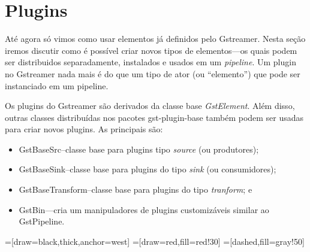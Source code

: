 \section{Plugins}
\label{sec:plugins}
Até agora só vimos como usar elementos já definidos pelo Gstreamer.  Nesta
seção iremos discutir como é possível criar novos tipos de elementos---os quais
podem ser distribuidos separadamente, instalados e usados em um
\emph{pipeline}.  Um plugin no Gstreamer nada mais é do que um tipo de ator (ou
``elemento'') que pode ser instanciado em um pipeline.



Os plugins do Gstreamer são derivados da classe base \emph{GstElement}.  Além
disso, outras classes distribuídas nos pacotes gst-plugin-base também podem ser
usadas para criar novos plugins.  As principais são:

\begin{itemize}
  \item{GstBaseSrc}--classe base para plugins tipo \emph{source} (ou
                     produtores);
  \item{GstBaseSink}--classe base para plugins do tipo \emph{sink} (ou
                      consumidores);
  \item{GstBaseTransform}--classe base para plugins do tipo \emph{tranform}; e
  \item{GstBin}---cria um manipuladores de plugins customizáveis similar ao
                  GstPipeline.
\end{itemize}

=[draw=black,thick,anchor=west]
=[draw=red,fill=red!30]
=[dashed,fill=gray!50]
\begin{figure}[H]
  \centering
  \label{fig:class_hierarchy}
\end{figure}

